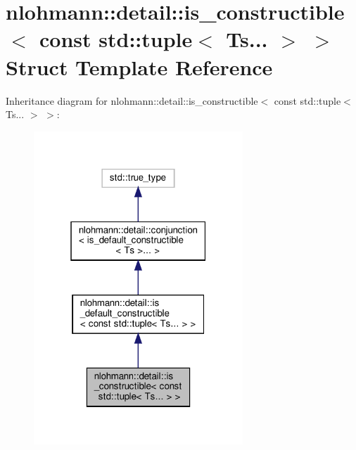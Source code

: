 \hypertarget{structnlohmann_1_1detail_1_1is__constructible_3_01const_01std_1_1tuple_3_01Ts_8_8_8_01_4_01_4}{}\section{nlohmann\+:\+:detail\+:\+:is\+\_\+constructible$<$ const std\+:\+:tuple$<$ Ts... $>$ $>$ Struct Template Reference}
\label{structnlohmann_1_1detail_1_1is__constructible_3_01const_01std_1_1tuple_3_01Ts_8_8_8_01_4_01_4}


Inheritance diagram for nlohmann\+:\+:detail\+:\+:is\+\_\+constructible$<$ const std\+:\+:tuple$<$ Ts... $>$ $>$\+:
\nopagebreak
\begin{figure}[H]
\begin{center}
\leavevmode
\includegraphics[width=223pt]{structnlohmann_1_1detail_1_1is__constructible_3_01const_01std_1_1tuple_3_01Ts_8_8_8_01_4_01_4__inherit__graph}
\end{center}
\end{figure}


